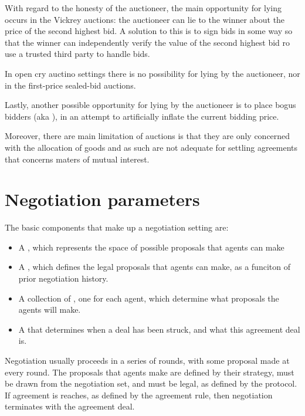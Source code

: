 With regard to the honesty of the auctioneer, the main opportunity for lying occurs in the Vickrey auctions: the auctioneer can lie to the winner about the price of the second highest bid. A solution to this is to sign bids in some way so that the winner can independently verify the value of the second highest bid ro use a trusted third party to handle bids.

In open cry auctino settings there is no possibility for lying by the auctioneer, nor in  the first-price sealed-bid auctions.

Lastly, another possible opportunity for lying by the auctioneer is to place bogus bidders (aka ), in an attempt to artificially inflate the current bidding price.

Moreover, there are main limitation of auctions is that they are only concerned with the allocation of goods and as such are not adequate for settling agreements that concerns maters of mutual interest.

\section{Negotiation parameters}
The basic components that make up a negotiation setting are:
\begin{itemize}
\item A , which represents the space of possible proposals that agents can make
\item A , which defines the legal proposals that agents can make, as a funciton of prior negotiation history.
\item A collection of , one for each agent, which determine what proposals the agents will make.
\item A  that determines when a deal has been struck, and what this agreement deal is.
\end{itemize}

Negotiation usually proceeds in a series of rounds, with some proposal made at every round. The proposals that agents make are defined by their strategy, must be drawn from the negotiation set, and must be legal, as defined by the protocol.\\
If agreement is reaches, as defined by the agreement rule, then negotiation terminates with the agreement deal.\\

